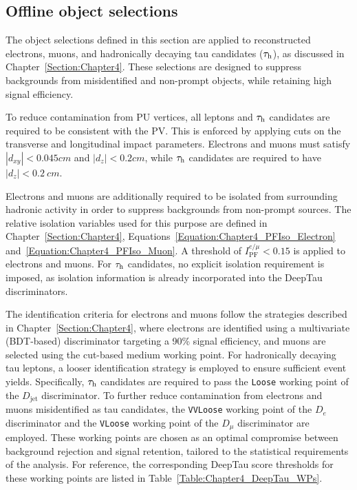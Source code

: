 \subsection{Offline object selections}
\label{sec:ObjectSelection}

The object selections defined in this section are applied to reconstructed electrons, muons, and hadronically decaying tau candidates ($\tau_\mathrm{h}$), as discussed in Chapter~\ref{Section:Chapter4}. These selections are designed to suppress backgrounds from misidentified and non-prompt objects, while retaining high signal efficiency. 

To reduce contamination from PU vertices, all leptons and $\tau_\mathrm{h}$ candidates are required to be consistent with the PV. This is enforced by applying cuts on the transverse and longitudinal impact parameters. Electrons and muons must satisfy $|d_{xy}| < 0.045\unit{cm}$ and $|d_z| < 0.2\unit{cm}$, while $\tau_\mathrm{h}$ candidates are required to have $|d_z| < 0.2~\unit{cm}$. 

Electrons and muons are additionally required to be isolated from surrounding hadronic activity in order to suppress backgrounds from non-prompt sources. The relative isolation variables used for this purpose are defined in Chapter~\ref{Section:Chapter4}, Equations~\ref{Equation:Chapter4_PFIso_Electron} and~\ref{Equation:Chapter4_PFIso_Muon}. A threshold of $I^{e/\mu}_\text{PF} < 0.15$ is applied to electrons and muons. For $\tau_\mathrm{h}$ candidates, no explicit isolation requirement is imposed, as isolation information is already incorporated into the DeepTau discriminators.

The identification criteria for electrons and muons follow the strategies described in Chapter~\ref{Section:Chapter4}, where electrons are identified using a multivariate (BDT-based) discriminator targeting a 90\% signal efficiency, and muons are selected using the cut-based medium working point.  For hadronically decaying tau leptons, a looser identification strategy is employed to ensure sufficient event yields. Specifically, $\tau_\mathrm{h}$ candidates are required to pass the \texttt{Loose} working point of the $D_{\text{jet}}$ discriminator. To further reduce contamination from electrons and muons misidentified as tau candidates, the \texttt{VVLoose} working point of the $D_e$ discriminator and the \texttt{VLoose} working point of the $D_\mu$ discriminator are employed. These working points are chosen as an optimal compromise between background rejection and signal retention, tailored to the statistical requirements of the analysis. For reference, the corresponding DeepTau score thresholds for these working points are listed in Table~\ref{Table:Chapter4_DeepTau_WPs}.

